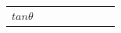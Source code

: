 \begin{center}
\begin{xtabular*}{\mytablewidth}[t]{|p{10\mystarwidth}|p{10\mystarwidth}|p{10\mystarwidth}|p{10\mystarwidth}|p{10\mystarwidth}|p{10\mystarwidth}|p{10\mystarwidth}|p{10\mystarwidth}|}
    
        
                  \begin{math}tan\theta \end{math}
                 &
    
    
         &
    
    
         &
    
    
         &
    
    
         &
    
    
         &
    
    
         &
    
    

\end{xtabular*}
\end{center}

